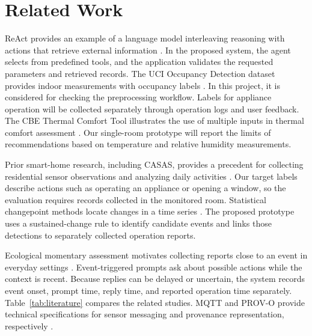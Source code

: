 \section{Related Work}
ReAct provides an example of a language model interleaving reasoning with actions that retrieve external information \cite{yao2023react}. In the proposed system, the agent selects from predefined tools, and the application validates the requested parameters and retrieved records. The UCI Occupancy Detection dataset provides indoor measurements with occupancy labels \cite{uci_occupancy}. In this project, it is considered for checking the preprocessing workflow. Labels for appliance operation will be collected separately through operation logs and user feedback. The CBE Thermal Comfort Tool illustrates the use of multiple inputs in thermal comfort assessment \cite{tartarini2020cbe}. Our single-room prototype will report the limits of recommendations based on temperature and relative humidity measurements.


Prior smart-home research, including CASAS, provides a precedent for collecting residential sensor observations and analyzing daily activities \cite{cook2013casas}. Our target labels describe actions such as operating an appliance or opening a window, so the evaluation requires records collected in the monitored room. Statistical changepoint methods locate changes in a time series \cite{killick2012changepoints}. The proposed prototype uses a sustained-change rule to identify candidate events and links those detections to separately collected operation reports.

Ecological momentary assessment motivates collecting reports close to an event in everyday settings \cite{shiffman2008ema}. Event-triggered prompts ask about possible actions while the context is recent. Because replies can be delayed or uncertain, the system records event onset, prompt time, reply time, and reported operation time separately. Table~\ref{tab:literature} compares the related studies. MQTT and PROV-O provide technical specifications for sensor messaging and provenance representation, respectively \cite{oasis2019mqtt,w3c2013provo}.



